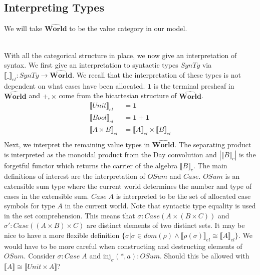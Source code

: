 \documentclass{article}
\newcommand{\injj}[2]{\textrm{inj}_{#1}#2}
\newcommand{\pworld}{\widehat{\mathbf{World}}}
\begin{document}
\subsection{Interpreting Types}
We will take $\pworld$ to be the value category in our model. 

\\

With all the categorical structure in place, we now give an interpretation of syntax. We first give an interpretation to syntactic types $SynTy$ via $\llbracket\_\rrbracket_{el} : SynTy \rightarrow \pworld$. We recall that the interpretation of these types is not dependent on what cases have been allocated. $\mathbf{1}$ is the terminal presheaf in $\pworld$ and $+,\times$ come from the bicartesian structure of $\pworld$.
\begin{align*}
    \llbracket Unit \rrbracket_{el} &= \mathbf{1}\\
    \llbracket Bool \rrbracket_{el} &= \mathbf{1}  + \mathbf{1}\\
    \llbracket A \times B \rrbracket_{el} &= \llbracket A \rrbracket_{el} \times \llbracket B \rrbracket_{el} \\
\end{align*}
Next, we interpret the remaining value types in $\pworld$. The separating product is interpreted as the monoidal product from the Day convolution and $| \llbracket B \rrbracket_c |$ is the forgetful functor which returns the carrier of the algebra $\llbracket B \rrbracket_c$. The main definitions of interest are the interpretation of $OSum$ and $Case$. $OSum$ is an extensible sum type where the current world determines the number and type of cases in the extensible sum. $Case \;A$ is interpreted to be the set of allocated case symbols for type $A$ in the current world. Note that syntactic type equality is used in the set comprehension. This means that $\sigma : Case (A \times (B \times C))$ and $\sigma' : Case((A \times B) \times C)$ are distinct elements of two distinct sets. It may be nice to have a more flexible definition $\{ \sigma | \sigma \in dom(\rho) \land \llbracket \rho(\sigma) \rrbracket_{el} \cong \llbracket A \rrbracket_{el}\}$. We would have to be more careful when constructing and destructing elements of $OSum$. Consider $\sigma : Case \;A$ and $\injj{\sigma}{(*,a)}: OSum$. Should this be allowed with $\llbracket A \rrbracket \cong \llbracket Unit \times A \rrbracket$?
\end{document}
